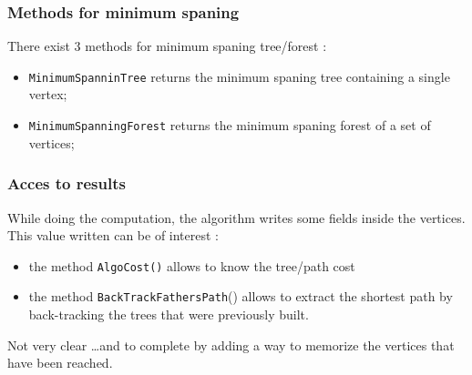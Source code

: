 \subsubsection{Methods for minimum spaning}

There exist $3$ methods for minimum spaning tree/forest :

\begin{itemize}
   \item {\tt MinimumSpanninTree} returns the minimum spaning tree containing a single vertex;

   \item {\tt MinimumSpanningForest} returns the minimum spaning forest of a set of vertices;

\end{itemize}


\subsubsection{Acces to results}

While doing the computation, the algorithm writes some fields inside the vertices.
This value written can be of interest :

\begin{itemize}
   \item  the method {\tt AlgoCost()}  allows to know the tree/path cost
   \item  the method {\tt BackTrackFathersPath}()  allows to extract the shortest path
          by back-tracking  the trees that were previously built.
\end{itemize}

Not very clear \dots and to complete by adding a way to memorize the vertices that have been reached.










